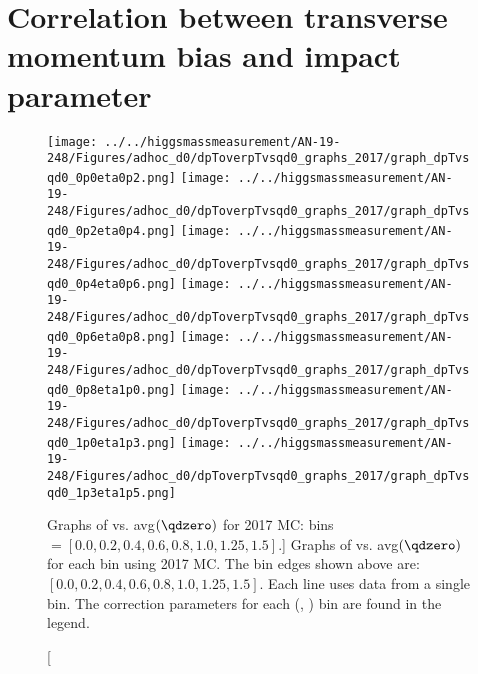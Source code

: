 \chapter{Correlation between transverse momentum bias and impact parameter}

\begin{figure}[!htbp]
    \centering
    { \texttt{[image: ../../higgsmassmeasurement/AN-19-248/Figures/adhoc\_d0/dpToverpTvsqd0\_graphs\_2017/graph\_dpTvsqd0\_0p0eta0p2.png]}}
    { \texttt{[image: ../../higgsmassmeasurement/AN-19-248/Figures/adhoc\_d0/dpToverpTvsqd0\_graphs\_2017/graph\_dpTvsqd0\_0p2eta0p4.png]}}
    { \texttt{[image: ../../higgsmassmeasurement/AN-19-248/Figures/adhoc\_d0/dpToverpTvsqd0\_graphs\_2017/graph\_dpTvsqd0\_0p4eta0p6.png]}}
    { \texttt{[image: ../../higgsmassmeasurement/AN-19-248/Figures/adhoc\_d0/dpToverpTvsqd0\_graphs\_2017/graph\_dpTvsqd0\_0p6eta0p8.png]}}
    { \texttt{[image: ../../higgsmassmeasurement/AN-19-248/Figures/adhoc\_d0/dpToverpTvsqd0\_graphs\_2017/graph\_dpTvsqd0\_0p8eta1p0.png]}}
    { \texttt{[image: ../../higgsmassmeasurement/AN-19-248/Figures/adhoc\_d0/dpToverpTvsqd0\_graphs\_2017/graph\_dpTvsqd0\_1p0eta1p3.png]}}
    { \texttt{[image: ../../higgsmassmeasurement/AN-19-248/Figures/adhoc\_d0/dpToverpTvsqd0\_graphs\_2017/graph\_dpTvsqd0\_1p3eta1p5.png]}}
    \caption
        [Graphs of \pTmismeas vs. avg$(\qdzero)$ for 2017 MC: bins $= [0.0, 0.2, 0.4, 0.6, 0.8, 1.0, 1.25, 1.5]$.]
        { 
        Graphs of \pTmismeas vs. avg$(\qdzero)$ for each \abseta bin using 2017 MC.
        The \abseta bin edges shown above are: $[0.0, 0.2, 0.4, 0.6, 0.8, 1.0, 1.25, 1.5]$.
        Each line uses data from a single \pT bin. 
        The \pT correction parameters for each (\abseta, \pT) bin are found in the legend.
    }
\end{figure}
\newpage
